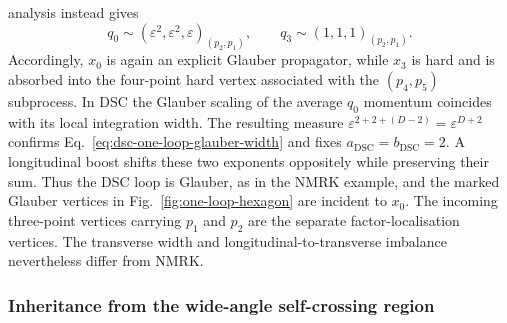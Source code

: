 \documentclass[a4paper,11pt]{article}
\begin{document}
analysis instead gives
\begin{equation}
 q_0\sim(\varepsilon^2,\varepsilon^2,\varepsilon)_{(p_2,p_1)},\qquad
 q_3\sim(1,1,1)_{(p_2,p_1)}.
 \label{eq:dsc-resolved-transfer-values}
\end{equation}
Accordingly, \(x_0\) is again an explicit Glauber propagator, while \(x_3\)
is hard and is absorbed into the four-point hard vertex associated with the
\((p_4,p_5)\) subprocess.  In DSC the Glauber scaling of the average
\(q_0\) momentum coincides with its local integration width.
The resulting measure
\(\varepsilon^{2+2+(D-2)}=\varepsilon^{D+2}\) confirms
Eq.~\eqref{eq:dsc-one-loop-glauber-width} and fixes
\(a_{\mathrm{DSC}}=b_{\mathrm{DSC}}=2\).  A longitudinal boost shifts these
two exponents oppositely while preserving their sum.  Thus the DSC loop is
Glauber, as in the NMRK example, and the marked Glauber vertices
in Fig.~\ref{fig:one-loop-hexagon} are incident to \(x_0\).  The incoming
three-point vertices carrying \(p_1\) and \(p_2\) are the separate
factor-localisation vertices.  The transverse width
and longitudinal-to-transverse imbalance nevertheless differ from NMRK.

\subsubsection{Inheritance from the wide-angle self-crossing region}
\end{document}
